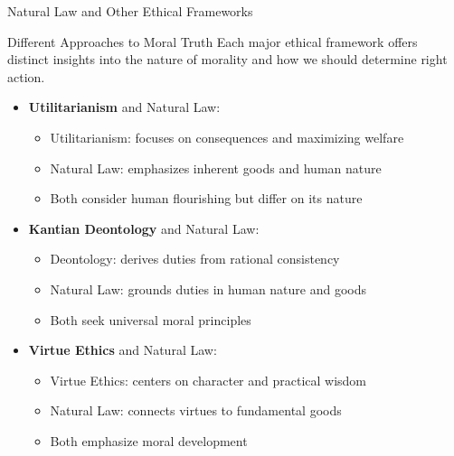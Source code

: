 \documentclass{beamer}
\begin{document}
\begin{frame}{Natural Law and Other Ethical Frameworks}
    \begin{alertblock}{Different Approaches to Moral Truth}
        Each major ethical framework offers distinct insights into the nature of morality and how we should determine right action.
    \end{alertblock}

    \begin{itemize}
        \item \textbf{Utilitarianism} and Natural Law:
        \begin{itemize}
            \item Utilitarianism: focuses on consequences and maximizing welfare
            \item Natural Law: emphasizes inherent goods and human nature
            \item Both consider human flourishing but differ on its nature
        \end{itemize}
        
        \item \textbf{Kantian Deontology} and Natural Law:
        \begin{itemize}
            \item Deontology: derives duties from rational consistency
            \item Natural Law: grounds duties in human nature and goods
            \item Both seek universal moral principles
        \end{itemize}
        
        \item \textbf{Virtue Ethics} and Natural Law:
        \begin{itemize}
            \item Virtue Ethics: centers on character and practical wisdom
            \item Natural Law: connects virtues to fundamental goods
            \item Both emphasize moral development
        \end{itemize}
    \end{itemize}
\end{frame}
\end{document}
